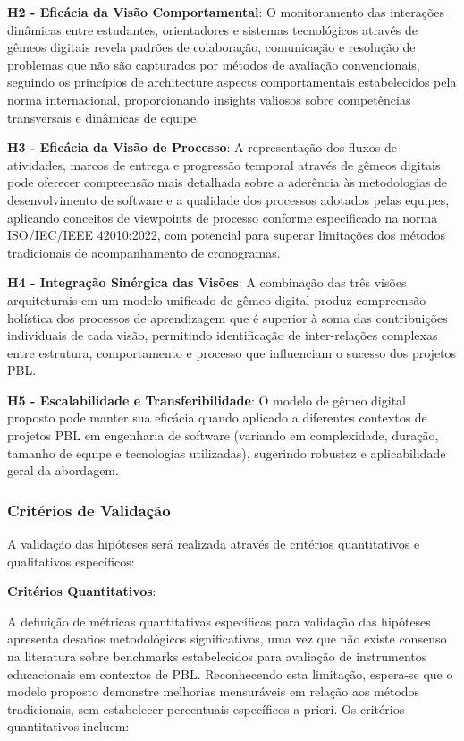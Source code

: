 \documentclass[12pt, a4paper, oneside, brazilian]{abntex2}
\begin{document}
\textbf{H2 - Eficácia da Visão Comportamental}: O monitoramento das interações dinâmicas entre estudantes, orientadores e sistemas tecnológicos através de gêmeos digitais revela padrões de colaboração, comunicação e resolução de problemas que não são capturados por métodos de avaliação convencionais, seguindo os princípios de architecture aspects comportamentais estabelecidos pela norma internacional, proporcionando insights valiosos sobre competências transversais e dinâmicas de equipe.

\textbf{H3 - Eficácia da Visão de Processo}: A representação dos fluxos de atividades, marcos de entrega e progressão temporal através de gêmeos digitais pode oferecer compreensão mais detalhada sobre a aderência às metodologias de desenvolvimento de software e a qualidade dos processos adotados pelas equipes, aplicando conceitos de viewpoints de processo conforme especificado na norma ISO/IEC/IEEE 42010:2022, com potencial para superar limitações dos métodos tradicionais de acompanhamento de cronogramas.

\textbf{H4 - Integração Sinérgica das Visões}: A combinação das três visões arquiteturais em um modelo unificado de gêmeo digital produz compreensão holística dos processos de aprendizagem que é superior à soma das contribuições individuais de cada visão, permitindo identificação de inter-relações complexas entre estrutura, comportamento e processo que influenciam o sucesso dos projetos PBL.

\textbf{H5 - Escalabilidade e Transferibilidade}: O modelo de gêmeo digital proposto pode manter sua eficácia quando aplicado a diferentes contextos de projetos PBL em engenharia de software (variando em complexidade, duração, tamanho de equipe e tecnologias utilizadas), sugerindo robustez e aplicabilidade geral da abordagem.

\subsubsection{Critérios de Validação}

A validação das hipóteses será realizada através de critérios quantitativos e qualitativos específicos:

\textbf{Critérios Quantitativos}:

A definição de métricas quantitativas específicas para validação das hipóteses apresenta desafios metodológicos significativos, uma vez que não existe consenso na literatura sobre benchmarks estabelecidos para avaliação de instrumentos educacionais em contextos de PBL. Reconhecendo esta limitação, espera-se que o modelo proposto demonstre melhorias mensuráveis em relação aos métodos tradicionais, sem estabelecer percentuais específicos a priori. Os critérios quantitativos incluem:
\end{document}

